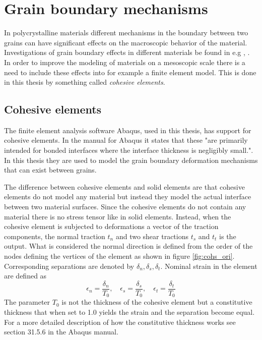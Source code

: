 \documentclass[grain_boundary_law.tex]{subfiles}
\begin{document}
\FloatBarrier

\chapter{Grain boundary mechanisms}


In polycrystalline materials different mechanisms in the boundary between two grains can have significant effects on the macroscopic behavior of the material. Investigations of grain boundary effects in different materials be found in e.g \cite{eff_grain}, \cite{grain_poly}. In order to improve the modeling of materials on a mesoscopic scale there is a need to include these effects into for example a finite element model. This is done in this thesis by something called \textit{cohesive elements}.

\section{Cohesive elements}

The finite element analysis software Abaqus, used in this thesis, has support for cohesive elements. In the manual for Abaqus it states that these "are primarily intended for bonded interfaces where the interface thickness is negligibly small.". In this thesis they are used to model the grain boundary deformation mechanisms that can exist between grains.

The difference between cohesive elements and solid elements are that cohesive elements do not model any material but instead they model the actual interface between two material surfaces. Since the cohesive elements do not contain any material there is no stress tensor like in solid elements. Instead, when the cohesive element is subjected to deformations a vector of the traction components, the normal traction $t_n$ and two shear tractions $t_s$ and $t_t$ is the output. What is considered the normal direction is defined from the order of the nodes defining the vertices of the element as shown in figure \ref{fig:cohs_ori}. Corresponding separations are denoted by $\delta_n, \delta_s, \delta_t$. Nominal strain in the element are defined as
%
\[ \epsilon_n = \frac{\delta_n}{T_0}, \quad \epsilon_s = \frac{\delta_s}{T_0}, \quad \epsilon_t = \frac{\delta_t}{T_0}  \]
%
The parameter $T_0$ is not the thickness of the cohesive element but a constitutive thickness that when set to 1.0 yields the strain and the separation become equal. For a more detailed description of how the constitutive thickness works see section 31.5.6 in the Abaqus manual.
\end{document}
